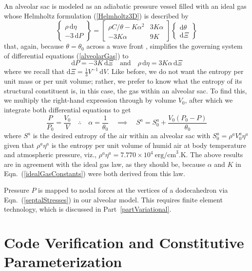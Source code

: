 An alveolar sac is modeled as an adiabatic pressure vessel filled with an ideal gas whose Helmholtz formulation (\ref{Helmholtz3D}) is described by
\begin{equation}
\left\{ \begin{matrix}
\rho \, \mathrm{d} \eta \\ -3 \, \mathrm{d} P
\end{matrix} \right\} = \begin{bmatrix}
\rho C / \theta - K \alpha^2 & 3 K \alpha \\ 
-3K\alpha & 9K
\end{bmatrix} \left\{ \begin{matrix}
\mathrm{d} \theta \\ \mathrm{d} \Xi
\end{matrix} \right\}
\label{alveolarGas}
\end{equation}
that, again, because $\theta = \theta_0$ across a wave front \cite{AmesStaff53}, simplifies the governing system of differential equations (\ref{alveolarGas}) to
\begin{displaymath}
    \mathrm{d}P = -3K \, \mathrm{d} \Xi 
    \quad \text{and} \quad
    \rho \, \mathrm{d} \eta = 3 K \alpha \, \mathrm{d} \Xi
\end{displaymath}
where we recall that $\mathrm{d}\Xi = \tfrac{1}{3} V^{-1} \, \mathrm{d} V$.  Like before, we do not want the entropy per unit mass or per unit volume; rather, we prefer to know what the entropy of its structural constituent is, in this case, the gas within an alveolar sac.  To find this, we multiply the right-hand expression through by volume $V_0$, after which we integrate both differential equations to get
\begin{equation}
    \frac{P}{P_0} = \frac{V_0}{V}
    \quad \therefore \quad
    \alpha = \frac{1}{\theta_0}
    \quad \implies \quad
    S^a = S^a_0 + \frac{V_0 ( P_0 - P )}{\theta_0}
    \label{alveolarSacCE}
\end{equation}
where $S^a$ is the desired entropy of the air within an alveolar sac with $S^a_0 = \rho^a V^a_0 \eta^a$ given that $\rho^a \eta^a$ is the entropy per unit volume of humid air at body temperature and atmospheric pressure, viz., $\rho^a \eta^a = 7.770 \times 10^4 \: \text{erg/cm}^3\text{.K}$.  The above results are in agreement with the ideal gas law, as they should be, because $\alpha$ and $K$ in Eqn.~(\ref{idealGasConstants}) were both derived from this law.

Pressure $P$ is mapped to nodal forces at the vertices of a dodecahedron via Eqn.~(\ref{septalStresses}) in our alveolar model.  This requires finite element technology, which is discussed in Part~\ref{partVariational}.

\section{Code Verification and Constitutive Parameterization}
